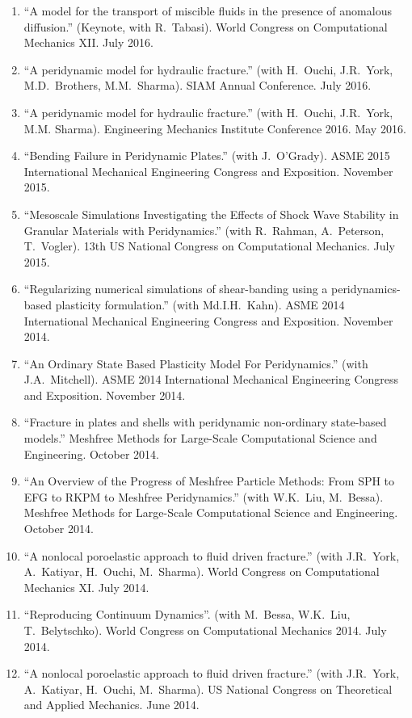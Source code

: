 \begin{etaremune}
\begin{enumerate}
    \item ``A model for the transport of miscible fluids in the presence of anomalous diffusion.'' (Keynote, with R.\ Tabasi). World Congress on Computational Mechanics XII.  July 2016.
    \item ``A peridynamic model for hydraulic fracture.'' (with H.\ Ouchi, J.R.\ York, M.D.\ Brothers, M.M.\ Sharma). SIAM Annual Conference.  July 2016.
    \item ``A peridynamic model for hydraulic fracture.'' (with H.\ Ouchi, J.R.\ York, M.M. Sharma). Engineering Mechanics Institute Conference 2016. May 2016.
    \item ``Bending Failure in Peridynamic Plates.'' (with J.~O'Grady). ASME 2015 International Mechanical Engineering Congress and Exposition. November 2015.
    \item ``Mesoscale Simulations Investigating the Effects of Shock Wave Stability in Granular Materials with Peridynamics.'' (with R.~Rahman, A.~Peterson, T.~Vogler). 13th US National Congress on Computational Mechanics. July 2015.
    \item ``Regularizing numerical simulations of shear-banding using a peridynamics-based plasticity formulation.'' (with Md.I.H.~Kahn). ASME 2014 International Mechanical Engineering Congress and Exposition. November 2014.
    \item ``An Ordinary State Based Plasticity Model For Peridynamics.'' (with J.A.~Mitchell). ASME 2014 International Mechanical Engineering Congress and Exposition. November 2014.
    \item ``Fracture in plates and shells with peridynamic non-ordinary state-based models.''  Meshfree Methods for Large-Scale Computational Science and Engineering. October 2014.
    \item ``An Overview of the Progress of Meshfree Particle Methods: From SPH to EFG to RKPM to Meshfree Peridynamics.'' (with W.K.~Liu, M.~Bessa). Meshfree Methods for Large-Scale Computational Science and Engineering. October 2014.
    \item ``A nonlocal poroelastic approach to fluid driven fracture.'' (with J.R.~York, A.~Katiyar, H.~Ouchi, M.~Sharma). World Congress on Computational Mechanics XI.  July 2014.
    \item ``Reproducing Continuum Dynamics''. (with M.~Bessa, W.K.~Liu, T.~Belytschko). World Congress on Computational Mechanics 2014.  July 2014.
    \item ``A nonlocal poroelastic approach to fluid driven fracture.'' (with J.R.~York, A.~Katiyar, H.~Ouchi, M.~Sharma). US National Congress on Theoretical and Applied Mechanics.  June 2014.

\end{enumerate}
\end{etaremune}
